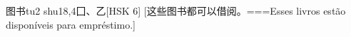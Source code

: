 \begin{EntryWithPhonetic}{图书}{tu2 shu1}{8,4}{⼞、⼄}[HSK 6]
  [这些图书都可以借阅。===Esses livros estão disponíveis para empréstimo.]
\end{EntryWithPhonetic}

